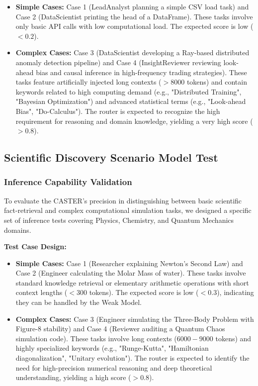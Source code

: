 \documentclass{article}
\theoremstyle{plain}
\theoremstyle{definition}
\theoremstyle{remark}
\begin{document}
\begin{itemize}
    \item \textbf{Simple Cases:} Case 1 (LeadAnalyst planning a simple CSV load task) and Case 2 (DataScientist printing the head of a DataFrame). These tasks involve only basic API calls with low computational load. The expected score is low ($<0.2$).
    \item \textbf{Complex Cases:} Case 3 (DataScientist developing a Ray-based distributed anomaly detection pipeline) and Case 4 (InsightReviewer reviewing look-ahead bias and causal inference in high-frequency trading strategies). These tasks feature artificially injected long contexts ($>8000$ tokens) and contain keywords related to high computing demand (e.g., "Distributed Training", "Bayesian Optimization") and advanced statistical terms (e.g., "Look-ahead Bias", "Do-Calculus"). The router is expected to recognize the high requirement for reasoning and domain knowledge, yielding a very high score ($>0.8$).
\end{itemize}

\subsection{Scientific Discovery Scenario Model Test}

\subsubsection{Inference Capability Validation}

To evaluate the CASTER's precision in distinguishing between basic scientific fact-retrieval and complex computational simulation tasks, we designed a specific set of inference tests covering Physics, Chemistry, and Quantum Mechanics domains.

\textbf{Test Case Design:}

\begin{itemize}\item \textbf{Simple Cases:} Case 1 (Researcher explaining Newton's Second Law) and Case 2 (Engineer calculating the Molar Mass of water). These tasks involve standard knowledge retrieval or elementary arithmetic operations with short context lengths ($<300$ tokens). The expected score is low ($<0.3$), indicating they can be handled by the Weak Model.\item \textbf{Complex Cases:} Case 3 (Engineer simulating the Three-Body Problem with Figure-8 stability) and Case 4 (Reviewer auditing a Quantum Chaos simulation code). These tasks involve long contexts ($6000-9000$ tokens) and highly specialized keywords (e.g., "Runge-Kutta", "Hamiltonian diagonalization", "Unitary evolution"). The router is expected to identify the need for high-precision numerical reasoning and deep theoretical understanding, yielding a high score ($>0.8$).\end{itemize}
\end{document}
